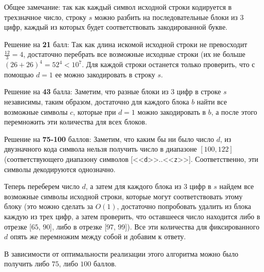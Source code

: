 Общее замечание: так как каждый символ исходной строки кодируется в трехзначное число, строку $s$ можно разбить на последовательные блоки из $3$ цифр, каждый из которых будет соответствовать закодированной букве.

Решение на \textbf{21} балл: Так как длина искомой исходной строки не превосходит $\frac{12}{3} = 4$, достаточно перебрать все возможные исходные строки (их не больше $(26 + 26)^4 = 52^4 < 10^7$. Для каждой строки останется только проверить, что с помощью $d = 1$ ее можно закодировать в строку $s$.

Решение на \textbf{43} балла: Заметим, что разные блоки из $3$ цифр в строке $s$ независимы, таким образом, достаточно для каждого блока $b$ найти все возможные символы $c$, которые при $d = 1$ можно закодировать в $b$, а после этого перемножить эти количества для всех блоков.

Решение на \textbf{75-100} баллов: Заметим, что каким бы ни было число $d$, из двузначного кода символа нельзя получить число в диапазоне $[100, 122]$ (соответствующего диапазону символов [<<\texttt{d}>>..<<\texttt{z}>>]. Соответственно, эти символы декодируются однозначно.

Теперь переберем число $d$, а затем для каждого блока из $3$ цифр в $s$ найдем все возможные символы исходной строки, которые могут соответствовать этому блоку (это можно сделать за $O(1)$, достаточно попробовать удалить из блока каждую из трех цифр, а затем проверить, что оставшееся число находится либо в отрезке [$65$, $90$], либо в отрезке [$97$, $99$]). Все эти количества для фиксированного $d$ опять же перемножим между собой и добавим к ответу.

В зависимости от оптимальности реализации этого алгоритма можно было получить либо $75$, либо $100$ баллов.
